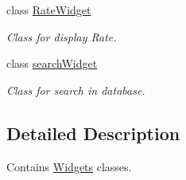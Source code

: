 \begin{DoxyCompactItemize}
class \hyperlink{classGui_1_1Widgets_1_1RateWidget}{Rate\-Widget}
\begin{DoxyCompactList}\small\item\em Class for display Rate. \end{DoxyCompactList}\item 
class \hyperlink{classGui_1_1Widgets_1_1searchWidget}{search\-Widget}
\begin{DoxyCompactList}\small\item\em Class for search in database. \end{DoxyCompactList}\end{DoxyCompactItemize}


\subsection{Detailed Description}
Contains \hyperlink{namespaceGui_1_1Widgets}{Widgets} classes. 